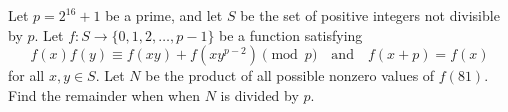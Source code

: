 Let $p = 2^{16}+1$ be a prime, and let $S$ be the set of positive integers not divisible by $p$.
Let $f: S \to \{0, 1, 2, \ldots, p-1\}$ be a function satisfying
\[ f(x)f(y) \equiv f(xy)+f(xy^{p-2}) \pmod{p} \quad\text{and}\quad f(x+p) = f(x) \]
for all $x,y \in S$.
Let $N$ be the product of all possible nonzero values of $f(81)$.
Find the remainder when when $N$ is divided by $p$.
